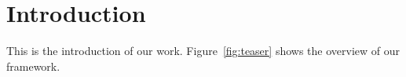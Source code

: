 \section{Introduction}
\label{sec:introduction}



This is the introduction of our work.
Figure~\ref{fig:teaser} shows the overview of our framework.
